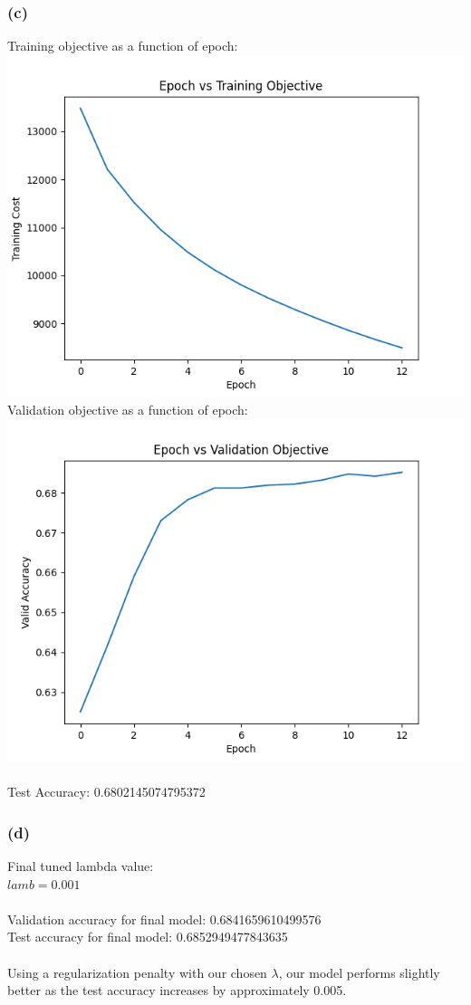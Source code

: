 \documentclass{article}
\begin{document}
\subsubsection{(c)}
Training objective as a function of epoch:\\
\includegraphics[scale=0.6]{figures/Aq3_train_objective_plot.png}\\
Validation objective as a function of epoch:\\
\includegraphics[scale=0.6]{figures/Aq3_valid_objective_plot.png}\\
\\
Test Accuracy: 0.6802145074795372
\subsubsection{(d)}
Final tuned lambda value:\\
$lamb = 0.001$\\
\\
Validation accuracy for final model: 0.6841659610499576\\
Test accuracy for final model: 0.6852949477843635\\
\\
Using a regularization penalty with our chosen $\lambda$, our model performs slightly better as the test accuracy increases by approximately 0.005.
\end{document}
